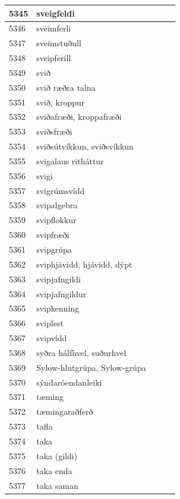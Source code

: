 \begin{longtable}{p{}|p{}|p{}|p{}|p{}}
\hline
5345 & sveigfeldi &  &  &  \\
\hline
5346 & sveimferli &  &  &  \\
\hline
5347 & sveimstuðull &  &  &  \\
\hline
5348 & sveipferill &  &  &  \\
\hline
5349 & svið &  &  &  \\
\hline
5350 & svið ræðra talna &  &  &  \\
\hline
5351 & svið, kroppur &  &  &  \\
\hline
5352 & sviðafræði, kroppafræði &  &  &  \\
\hline
5353 & sviðsfræði &  &  &  \\
\hline
5354 & sviðsútvíkkun, sviðsvíkkun &  &  &  \\
\hline
5355 & svigalaus ritháttur &  &  &  \\
\hline
5356 & svigi &  &  &  \\
\hline
5357 & svigrúmsvídd &  &  &  \\
\hline
5358 & svipalgebra &  &  &  \\
\hline
5359 & svipflokkur &  &  &  \\
\hline
5360 & svipfræði &  &  &  \\
\hline
5361 & svipgrúpa &  &  &  \\
\hline
5362 & sviphjávídd, hjávídd, dýpt &  &  &  \\
\hline
5363 & svipjafngildi &  &  &  \\
\hline
5364 & svipjafngildur &  &  &  \\
\hline
5365 & svipkenning &  &  &  \\
\hline
5366 & sviplest &  &  &  \\
\hline
5367 & svipvídd &  &  &  \\
\hline
5368 & syðra hálfhvel, suðurhvel &  &  &  \\
\hline
5369 & Sylow-hlutgrúpa, Sylow-grúpa &  &  &  \\
\hline
5370 & sýndaróendanleiki &  &  &  \\
\hline
5371 & tæming &  &  &  \\
\hline
5372 & tæmingaraðferð &  &  &  \\
\hline
5373 & tafla &  &  &  \\
\hline
5374 & taka &  &  &  \\
\hline
5375 & taka (gildi) &  &  &  \\
\hline
5376 & taka enda &  &  &  \\
\hline
5377 & taka saman &  &  &  \\

\end{longtable}
